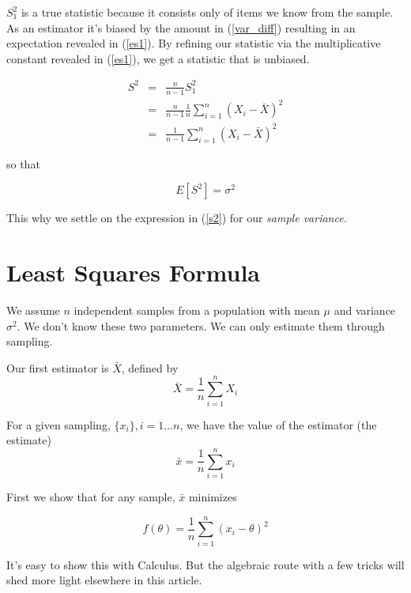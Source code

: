 \documentclass[]{article}
\begin{document}
$S_1^2$ is a true statistic because it consists only of items we know
from the sample.  As an estimator it's biased by the amount in
(\ref{var_diff}) resulting in an expectation revealed in (\ref{es1}).
By refining our statistic via the multiplicative constant revealed in
(\ref{es1}), we get a statistic that is unbiased.

\begin{eqnarray}
S^2 &= & \frac{n}{n-1} S_1^2 \nonumber \\
    &= & \frac{n}{n-1} \frac{1}{n} \sum_{i=1}^n \left( X_i - \bar{X} \right)^2 \nonumber \\
    &= & \frac{1}{n-1} \sum_{i=1}^n \left( X_i - \bar{X} \right)^2 \label{s2}
\end{eqnarray}

so that

$$
E \left[S^2 \right] = \sigma^2
$$

This why we settle on the expression in (\ref{s2}) for our \emph{sample variance}.

\appendix

\section{Least Squares Formula} \label{sec:least_squares_formula}

We assume $n$ independent samples from a population with
mean $\mu$ and variance $\sigma^2$.  We don't know these
two parameters.  We can only estimate them through sampling.

Our first estimator is $\bar{X}$, defined by
\begin{equation}
\bar{X} = \frac{1}{n} \sum_{i=1}^n X_i
\end{equation}

For a given sampling, $\{x_i\}, i=1 \ldots n$, we have the
value of the estimator (the estimate)
$$
\bar{x} = \frac{1}{n} \sum_{i=1}^n x_i
$$

First we show that for any sample, $\bar{x}$ minimizes

\begin{equation} \label{least_squares}
f(\theta) = \frac{1}{n} \sum_{i=1}^n (x_i - \theta)^2
\end{equation}

It's easy to show this with Calculus.  But the algebraic
route with a few tricks will shed more light elsewhere in
this article.
\end{document}
